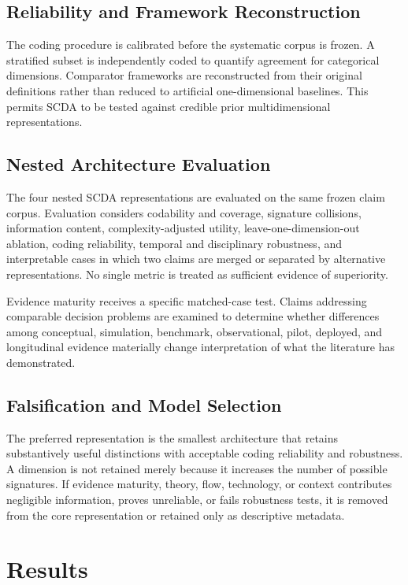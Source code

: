 \documentclass[journal]{IEEEtran}
\begin{document}
\subsection{Reliability and Framework Reconstruction}
The coding procedure is calibrated before the systematic corpus is frozen. A stratified subset is independently coded to quantify agreement for categorical dimensions. Comparator frameworks are reconstructed from their original definitions rather than reduced to artificial one-dimensional baselines. This permits SCDA to be tested against credible prior multidimensional representations.

\subsection{Nested Architecture Evaluation}
The four nested SCDA representations are evaluated on the same frozen claim corpus. Evaluation considers codability and coverage, signature collisions, information content, complexity-adjusted utility, leave-one-dimension-out ablation, coding reliability, temporal and disciplinary robustness, and interpretable cases in which two claims are merged or separated by alternative representations. No single metric is treated as sufficient evidence of superiority.

Evidence maturity receives a specific matched-case test. Claims addressing comparable decision problems are examined to determine whether differences among conceptual, simulation, benchmark, observational, pilot, deployed, and longitudinal evidence materially change interpretation of what the literature has demonstrated.

\subsection{Falsification and Model Selection}
The preferred representation is the smallest architecture that retains substantively useful distinctions with acceptable coding reliability and robustness. A dimension is not retained merely because it increases the number of possible signatures. If evidence maturity, theory, flow, technology, or context contributes negligible information, proves unreliable, or fails robustness tests, it is removed from the core representation or retained only as descriptive metadata.

\section{Results}
\end{document}

